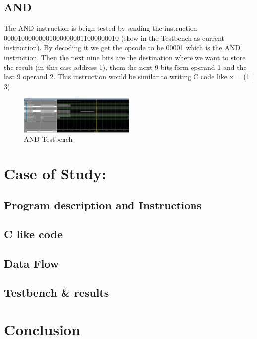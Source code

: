 \documentclass[9pt,a4paper,twoside]{tau}
\begin{document}
        \subsection{AND}
        The AND instruction is beign tested by sending the instruction 000010000000010000000011000000010 (show in the Testbench as current instruction). By decoding it we get the opcode to be 00001 which is the AND instruction, Then the next nine bits are the destination where we want to store the result (in this case address 1), them the next 9 bits form operand 1 and the last 9 operand 2. This instruction would be similar to writing C code like x = (1 | 3)
        \begin{figure}[h]  %
            \centering  %
            \includegraphics[width=0.5\textwidth]{images_tb/and_tb.png}
            \caption{AND Testbench}
            \label{fig:ISA Format}
        \end{figure}

\section{Case of Study:}
    \subsection{Program description and Instructions}

    \subsection{C like code}

    \subsection{Data Flow}

    \subsection{Testbench \& results}


     
\section{Conclusion}
\justifying
\end{document}
